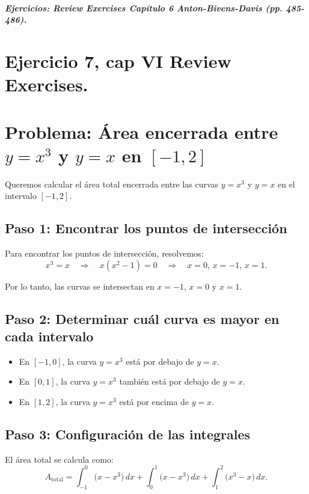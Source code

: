 \documentclass[11pt,letterpaper]{article}
\begin{document}

\subparagraph{Ejercicios: Review Exercises Capítulo 6 Anton-Bivens-Davis (pp. 485-486).}

\section{Ejercicio 7, cap VI Review Exercises.}
\section*{Problema: Área encerrada entre \( y = x^3 \) y \( y = x \) en \([-1, 2]\)}

Queremos calcular el área total encerrada entre las curvas \( y = x^3 \) y \( y = x \) en el intervalo \([-1, 2]\). 

\subsection*{Paso 1: Encontrar los puntos de intersección}
Para encontrar los puntos de intersección, resolvemos:
\[
x^3 = x \quad \Rightarrow \quad x(x^2 - 1) = 0 \quad \Rightarrow \quad x = 0, \, x = -1, \, x = 1.
\]

Por lo tanto, las curvas se intersectan en \( x = -1 \), \( x = 0 \) y \( x = 1 \).

\subsection*{Paso 2: Determinar cuál curva es mayor en cada intervalo}
\begin{itemize}
 \item En \([-1, 0]\), la curva \( y = x^3 \) está por debajo de \( y = x \).
 \item En \([0, 1]\), la curva \( y = x^3 \) también está por debajo de \( y = x \).
 \item En \([1, 2]\), la curva \( y = x^3 \) está por encima de \( y = x \).
\end{itemize}

\subsection*{Paso 3: Configuración de las integrales}
El área total se calcula como:
\[
A_{\text{total}} = \int_{-1}^0 \big(x - x^3\big) \, dx + \int_0^1 \big(x - x^3\big) \, dx + \int_1^2 \big(x^3 - x\big) \, dx.
\]
\end{document}
